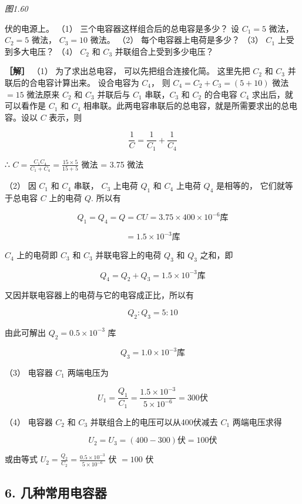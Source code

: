 \emph{图1.60}

伏的电源上。 （1） 三个电容器这样组合后的总电容是多少？ 设 \(C_{1} = 5\)
微法， \(C_{2} = 5\) 微法， \(C_{3} = 10\) 微法。 （2）
每个电容器上电荷是多少？ （3） \(C_{1}\) 上受到多大电压？ （4）
\(C_{2}\) 和 \(C_{3}\) 并联组合上受到多少电压？

\textbf{［解］} （1） 为了求出总电容， 可以先把组合连接化简。 这里先把
\(C_{2}\) 和 \(C_{3}\) 并联后的合电容计算出来。 设合电容为 \(C_{4}\)，
则 \(C_{4} = C_{2} + C_{3} = (5 + 10)\) 微法 \(= 15\) 微法原来 \(C_2\)
和 \(C_3\) 并联后与 \(C_1\) 串联，\(C_3\) 和 \(C_2\) 的合电容 \(C_4\)
求出后，就可以看作是 \(C_1\) 和 \(C_4\)
相串联。此两电容串联后的总电容，就是所需要求出的总电容。设以 \(C\)
表示，则

\[
\frac{1}{C} = \frac{1}{C_{1}} + \frac{1}{C_{4}}
\]

∴ \(C=\frac{C_{1}C_{4}}{C_{1}+C_{4}}=\frac{15\times5}{15+5}\) 微法 =
3.75 微法

（2） 因 \(C_1\) 和 \(C_4\) 串联， \(C_3\) 上电荷 \(Q_1\) 和 \(C_4\)
上电荷 \(Q_4\) 是相等的， 它们就等于总电容 \(C\) 上的电荷 \(Q\). 所以有

\[
Q_{1}=Q_{4}=Q=CU = 3.75 \times 400 \times 10^{- 6} \text{库}
\]

\[
= 1.5 \times 10^{- 3} \text{库}
\]

\(C_{4}\) 上的电荷即 \(C_{3}\) 和 \(C_{3}\) 并联电容上的电荷 \(Q_{3}\)
和 \(Q_{3}\) 之和，即

\[
Q_{4}=Q_{2}+Q_{3} = 1.5 \times 10^{- 3} \text{库}
\]

又因并联电容器上的电荷与它的电容成正比，所以有

\[
Q_{2}:Q_{3}=5:10
\]

由此可解出 \(Q_{2} = 0.5\times 10^{-3}\) 库

\[
Q_{3}=1.0\times10^{-3} \text{库}
\]

（3） 电容器 \(C_{1}\) 两端电压为

\[
U_{1} = \frac{Q_{1}}{C_{1}} = \frac{1.5 \times 10^{- 3}}{5\times10^{-6}} = 300 \text{伏}
\]

（4） 电容器 \(C_{2}\) 和 \(C_{3}\) 并联组合上的电压可以从400伏减去
\(C_{1}\) 两端电压求得

\[
U_{2} = U_{3} = (400 - 300) \text{伏} = 100 \text{伏}
\]

或由等式
\(U_{2} = \frac{Q_{2}}{C_{2}} = \frac{0.5\times 10^{-3}}{5\times 10^{-6}}\)
伏 \(= 100\) 伏

\subsection{6.
几种常用电容器}\label{ux51e0ux79cdux5e38ux7528ux7535ux5bb9ux5668}

